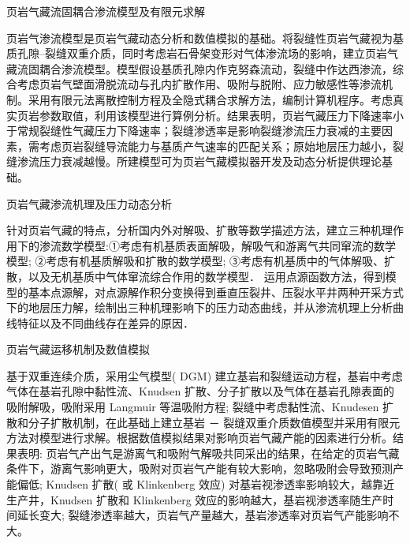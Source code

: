 \documentclass{article}
\begin{document}
页岩气藏流固耦合渗流模型及有限元求解

页岩气渗流模型是页岩气藏动态分析和数值模拟的基础。将裂缝性页岩气藏视为基质孔隙–裂缝双重介质，同时考虑岩石骨架变形对气体渗流场的影响，建立页岩气藏流固耦合渗流模型。模型假设基质孔隙内作克努森流动，裂缝中作达西渗流，综合考虑页岩气壁面滑脱流动与孔内扩散作用、吸附与脱附、应力敏感性等渗流机制。采用有限元法离散控制方程及全隐式耦合求解方法，编制计算机程序。考虑真实页岩参数取值，利用该模型进行算例分析。结果表明，页岩气藏压力下降速率小于常规裂缝性气藏压力下降速率；裂缝渗透率是影响裂缝渗流压力衰减的主要因素，需考虑页岩裂缝导流能力与基质产气速率的匹配关系；原始地层压力越小，裂缝渗流压力衰减越慢。所建模型可为页岩气藏模拟器开发及动态分析提供理论基础。

页岩气藏渗流机理及压力动态分析

针对页岩气藏的特点，分析国内外对解吸、扩散等数学描述方法，建立三种机理作用下的渗流数学模型:①考虑有机基质表面解吸，解吸气和游离气共同窜流的数学模型; ②考虑有机基质解吸和扩散的数学模型; ③考虑有机基质中的气体解吸、扩散，以及无机基质中气体窜流综合作用的数学模型． 运用点源函数方法，得到模型的基本点源解，对点源解作积分变换得到垂直压裂井、压裂水平井两种开采方式下的地层压力解，绘制出三种机理影响下的压力动态曲线，并从渗流机理上分析曲线特征以及不同曲线存在差异的原因．

页岩气藏运移机制及数值模拟

基于双重连续介质，采用尘气模型( DGM) 建立基岩和裂缝运动方程，基岩中考虑气体在基岩孔隙中黏性流、Knudsen 扩散、分子扩散以及气体在基岩孔隙表面的吸附解吸，吸附采用 Langmuir 等温吸附方程; 裂缝中考虑黏性流、Knudesen 扩散和分子扩散机制，在此基础上建立基岩 － 裂缝双重介质数值模型并采用有限元方法对模型进行求解。根据数值模拟结果对影响页岩气藏产能的因素进行分析。结果表明: 页岩气产出气是游离气和吸附气解吸共同采出的结果，在给定的页岩气藏条件下，游离气影响更大，吸附对页岩气产能有较大影响，忽略吸附会导致预测产能偏低; Knudsen 扩散( 或 Klinkenberg 效应) 对基岩视渗透率影响较大，越靠近生产井，Knudsen 扩散和 Klinkenberg 效应的影响越大，基岩视渗透率随生产时间延长变大; 裂缝渗透率越大，页岩气产量越大，基岩渗透率对页岩气产能影响不大。
\cite{seepage}\cite{Numerical}\cite{Yan2016}\cite{thermal}\cite{渗透率各向异性疏松砂岩脱砂压裂产能流固耦合模拟}\cite{致密油开发水平井段页岩坍塌周期的确定}\cite{页岩气数值模拟技术进展及展望}\cite{页岩气藏三孔双渗模型的渗流机理}\cite{页岩气藏水平井分段压裂渗流特征数值模拟}\cite{页岩气藏流固耦合渗流模型及有限元求解}\cite{页岩气藏渗流机理及压力动态分析}\cite{页岩气藏运移机制及数值模拟}


\end{document}
